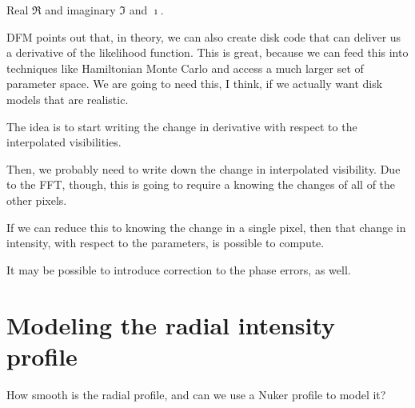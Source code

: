 \documentclass[modern]{aastex62}
\begin{document}
Real $\Re$ and imaginary $\Im$ and $\imath$.

DFM points out that, in theory, we can also create disk code that can deliver us a derivative of the likelihood function. This is great, because we can feed this into techniques like Hamiltonian Monte Carlo and access a much larger set of parameter space. We are going to need this, I think, if we actually want disk models that are realistic.

The idea is to start writing the change in derivative with respect to the interpolated visibilities.

Then, we probably need to write down the change in interpolated visibility. Due to the FFT, though, this is going to require a knowing the changes of all of the other pixels.

If we can reduce this to knowing the change in a single pixel, then that change in intensity, with respect to the parameters, is possible to compute.

It may be possible to introduce correction to the phase errors, as well.

\section{Modeling the radial intensity profile}
How smooth is the radial profile, and can we use a Nuker profile to model it?


\acknowledgments




\end{document}
